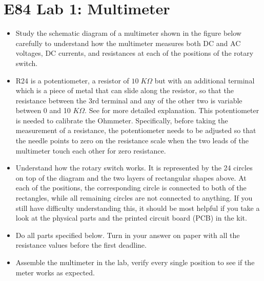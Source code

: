 \usepackage{html}


\section*{E84 Lab 1: Multimeter}



\begin{itemize}

  \item Study the schematic diagram of a multimeter shown in the figure
    below carefully to understand how the multimeter measures both DC and
    AC voltages, DC currents, and resistances at each of the positions of 
    the rotary switch. 

  \item R24 is a potentiometer, a resistor of $10\;K\Omega$ but with an 
    additional terminal which is a piece of metal that can slide along the
    resistor, so that the resistance between the 3rd terminal and any of 
    the other two is variable between 0 and 10 $K\Omega$. See
    for more detailed explanation. This potentiometer is needed to calibrate
    the Ohmmeter. Specifically, before taking the measurement of a resistance,
    the potentiometer needs to be adjusted so that the needle points to 
    zero on the resistance scale when the two leads of the multimeter touch
    each other for zero resistance.
    
  \item Understand how the rotary switch works. It is represented by the 
    24 circles on top of the diagram and the two layers of rectangular shapes
    above. At each of the positions, the corresponding circle is connected to
    both of the rectangles, while all remaining circles are not connected to
    anything. If you still have difficulty understanding this, it should be
    most helpful if you take a look at the physical parts and the printed 
    circuit board (PCB) in the kit.

  \item Do all parts specified below. Turn in your answer on paper with all 
    the resistance values before the first deadline. 

  \item Assemble the multimeter in the lab, verify every single position 
    to see if the meter works as expected.
    
\end{itemize}


